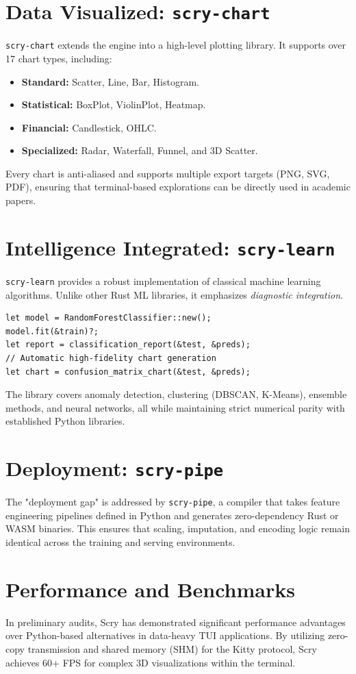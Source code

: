 \documentclass[11pt,twocolumn]{article}
\begin{document}
\section{Data Visualized: \texttt{scry-chart}}
\texttt{scry-chart} extends the engine into a high-level plotting library. It supports over 17 chart types, including:
\begin{itemize}
    \item \textbf{Standard:} Scatter, Line, Bar, Histogram.
    \item \textbf{Statistical:} BoxPlot, ViolinPlot, Heatmap.
    \item \textbf{Financial:} Candlestick, OHLC.
    \item \textbf{Specialized:} Radar, Waterfall, Funnel, and 3D Scatter.
\end{itemize}
Every chart is anti-aliased and supports multiple export targets (PNG, SVG, PDF), ensuring that terminal-based explorations can be directly used in academic papers.

\section{Intelligence Integrated: \texttt{scry-learn}}
\texttt{scry-learn} provides a robust implementation of classical machine learning algorithms. Unlike other Rust ML libraries, it emphasizes \textit{diagnostic integration}. 
\begin{lstlisting}[caption=Integrated Visualization in scry-learn]
let model = RandomForestClassifier::new();
model.fit(&train)?;
let report = classification_report(&test, &preds);
// Automatic high-fidelity chart generation
let chart = confusion_matrix_chart(&test, &preds);
\end{lstlisting}
The library covers anomaly detection, clustering (DBSCAN, K-Means), ensemble methods, and neural networks, all while maintaining strict numerical parity with established Python libraries.

\section{Deployment: \texttt{scry-pipe}}
The "deployment gap" is addressed by \texttt{scry-pipe}, a compiler that takes feature engineering pipelines defined in Python and generates zero-dependency Rust or WASM binaries. This ensures that scaling, imputation, and encoding logic remain identical across the training and serving environments.

\section{Performance and Benchmarks}
In preliminary audits, Scry has demonstrated significant performance advantages over Python-based alternatives in data-heavy TUI applications. By utilizing zero-copy transmission and shared memory (SHM) for the Kitty protocol, Scry achieves 60+ FPS for complex 3D visualizations within the terminal.
\end{document}
